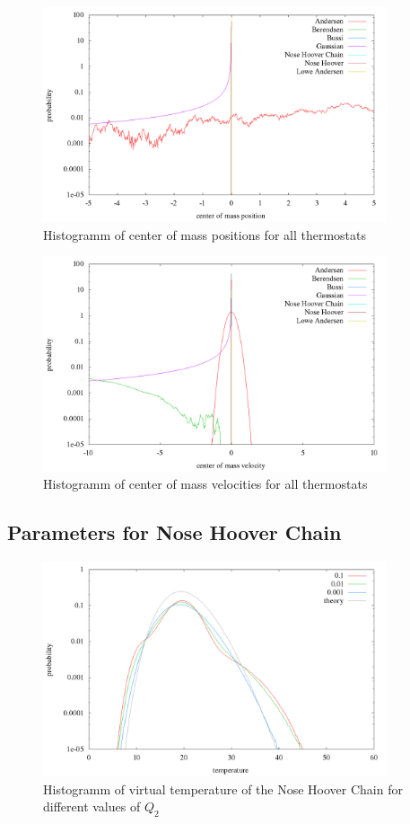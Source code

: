 \begin{figure}[H]
\centering
\includegraphics[width=0.9\textwidth]{./graphics/Histogramm_schwerPos_one_T=20_p=64.png}
\caption{Histogramm of center of mass positions for all thermostats}
\label{im:schwerPos_one}
\end{figure} 

\begin{figure}[H]
\centering
\includegraphics[width=0.9\textwidth]{./graphics/Histogramm_schwerVel_one_T=20_p=64.png}
\caption{Histogramm of center of mass velocities for all thermostats}
\label{im:schwerVel_one}
\end{figure} 

\subsection{Parameters for Nose Hoover Chain}

\begin{figure}[H]
\centering
\includegraphics[width=0.9\textwidth]{./graphics/Histogramm_tempCol_one_Chain.png}
\caption{Histogramm of virtual temperature of the Nose Hoover Chain for different values of $Q_2$ }
\label{im:temp_chain}
\end{figure}



